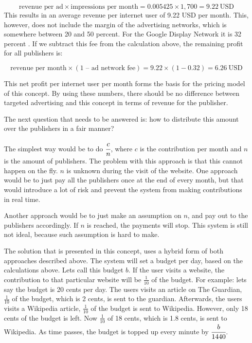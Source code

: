 \begin{equation}
  \text{revenue per ad} \times \text{impressions per month} = 0.005425 \times 1,700 = 9.22 ~\text{USD}
\end{equation}
This results in an average revenue per internet user of 9.22 USD per month. This, however, does not include the margin of the advertising networks, which is somewhere between 20 and 50 percent. For the Google Display Network it is 32 percent \cite{googlefee}. If we subtract this fee from the calculation above, the remaining profit for all publishers is:


\begin{equation}
  \text{revenue per month} \times (\text{1 -- ad network fee}) = 9.22 \times (1 - 0.32) = 6.26 ~\text{USD}
\end{equation}


This net profit per internet user per month forms the basis for the pricing model of this concept. By using these numbers, there should be no difference between targeted advertising and this concept in terms of revenue for the publisher.

The next question that needs to be answered is: how to distribute this amount over the publishers in a fair manner?  

The simplest way would be to do $\cfrac{c}{n}$, where $c$ is the contribution per month and $n$ is the amount of publishers. The problem with this approach is that this cannot happen on the fly. $n$ is unknown during the visit of the website. One approach would be to just pay all the publishers once at the end of every month, but that would introduce a lot of risk and prevent the system from making contributions in real time. 

Another approach would be to just make an assumption on $n$, and pay out to the publishers accordingly. If $n$ is reached, the payments will stop. This system is still not ideal, because such assumption is hard to make.

The solution that is presented in this concept, uses a hybrid form of both approaches described above. The system will set a budget per day, based on the calculations above. Lets call this budget $b$. If the user visits a website, the contribution to that particular website will be $\frac{1}{10}$ of the budget. For example: lets say the budget is 20 cents per day. The users visits an article on The Guardian, $\frac{1}{10}$ of the budget, which is 2 cents, is sent to the guardian. Afterwards, the users visits a Wikipedia article, $\frac{1}{10}$ of the budget is sent to Wikipedia. However, only 18 cents of the budget is left. Now $\frac{1}{10}$ of 18 cents, which is 1.8 cents, is sent to Wikipedia. As time passes, the budget is topped up every minute by $\cfrac{b}{1440}$.

